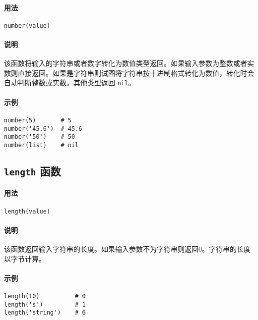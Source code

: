 \paragraph{用法}
\begin{lstlisting}[language=berry, numbers=none]
number(value)
\end{lstlisting}

\paragraph{说明}
该函数将输入的字符串或者数字转化为数值类型返回。如果输入参数为整数或者实数则直接返回。如果是字符串则试图将字符串按十进制格式转化为数值，转化时会自动判断整数或实数。其他类型返回 \texttt{nil}。

\paragraph{示例}
\begin{lstlisting}[language=berry, numbers=none]
number(5)       # 5
number('45.6')  # 45.6
number('50')    # 50
number(list)    # nil
\end{lstlisting}

\subsection{\texttt{length} 函数}

\paragraph{用法}
\begin{lstlisting}[language=berry, numbers=none]
length(value)
\end{lstlisting}

\paragraph{说明}
该函数返回输入字符串的长度。如果输入参数不为字符串则返回0。字符串的长度以字节计算。

\paragraph{示例}
\begin{lstlisting}[language=berry, numbers=none]
length(10)          # 0
length('s')         # 1
length('string')    # 6
\end{lstlisting}

